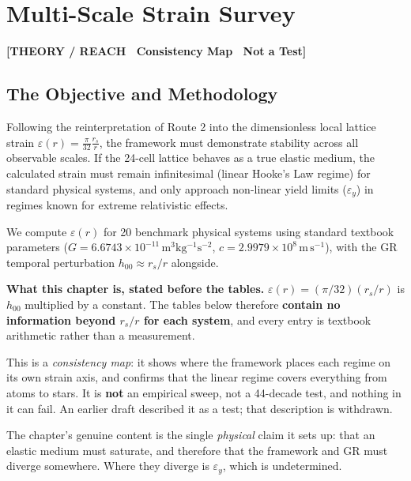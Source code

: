 \documentclass[11pt, letterpaper, openany]{book}
\begin{document}
\chapter{Multi-Scale Strain Survey}

\begin{center}
{\color{theorytag}\textbf{[THEORY / REACH \textbullet\ Consistency Map \textbullet\ Not a Test]}}
\end{center}

\section{The Objective and Methodology}

Following the reinterpretation of Route 2 into the dimensionless local lattice strain $\varepsilon(r) = \frac{\pi}{32}\frac{r_s}{r}$, the framework must demonstrate stability across all observable scales. If the 24-cell lattice behaves as a true elastic medium, the calculated strain must remain infinitesimal (linear Hooke's Law regime) for standard physical systems, and only approach non-linear yield limits ($\varepsilon_y$) in regimes known for extreme relativistic effects.

We compute $\varepsilon(r)$ for 20 benchmark physical systems using standard textbook parameters
($G = 6.6743 \times 10^{-11}\,\mathrm{m^3kg^{-1}s^{-2}}$, $c = 2.9979 \times 10^8\,\mathrm{m\,s^{-1}}$),
with the GR temporal perturbation $h_{00} \approx r_s/r$ alongside.

\begin{warningbox}
\textbf{What this chapter is, stated before the tables.} $\varepsilon(r) = (\pi/32)(r_s/r)$ is
$h_{00}$ multiplied by a constant. The tables below therefore \textbf{contain no information beyond
$r_s/r$ for each system}, and every entry is textbook arithmetic rather than a measurement.

\medskip
This is a \emph{consistency map}: it shows where the framework places each regime on its own strain
axis, and confirms that the linear regime covers everything from atoms to stars. It is \textbf{not}
an empirical sweep, not a 44-decade test, and nothing in it can fail. An earlier draft described it
as a test; that description is withdrawn.

\medskip
The chapter's genuine content is the single \emph{physical} claim it sets up: that an elastic medium
must saturate, and therefore that the framework and GR must diverge somewhere. Where they diverge is
$\varepsilon_y$, which is undetermined.
\end{warningbox}
\end{document}

